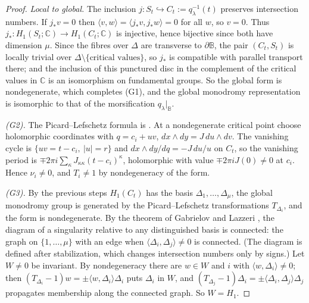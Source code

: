 \documentclass[11pt]{article}
\numberwithin{equation}{section}
\theoremstyle{definition}
\theoremstyle{remark}
\newcommand{\C}{\mathbb C}\newcommand{\Q}{\mathbb Q}\newcommand{\R}{\mathbb R}\newcommand{\Z}{\mathbb Z}
\begin{document}
\begin{proof}
\emph{Local to global.} The inclusion $j:S_t\hookrightarrow C_t:=q_\lambda^{-1}(t)$
preserves intersection numbers. If $j_*v=0$ then
$\langle v,w\rangle=\langle j_*v,j_*w\rangle=0$ for all $w$, so $v=0$. Thus
$j_*:H_1(S_t;\C)\to H_1(C_t;\C)$ is injective, hence bijective since both have
dimension $\mu$. Since the fibres over $\Delta$ are transverse to $\partial\mathbb B$, the pair
$(C_t,S_t)$ is locally trivial over $\Delta\setminus\{\text{critical values}\}$,
so $j_*$ is compatible with parallel transport there; and the inclusion of
this punctured disc in the complement of the critical values in $\C$ is an
isomorphism on fundamental groups. So the global form is
nondegenerate, which completes (G1), and the global monodromy representation is
isomorphic to that of the morsification $q_\lambda|_{\mathbb B}$.

\emph{(G2).} The Picard--Lefschetz formula is \cite[\S1.3, p.~26]{AGV}. At a
nondegenerate critical point choose holomorphic coordinates with
$q=c_i+uv$, $dx\wedge dy=J\,du\wedge dv$. The vanishing cycle is
$\{uv=t-c_i,\ |u|=r\}$ and $dx\wedge dy/dq=-J\,du/u$ on $C_t$, so the vanishing
period is $\mp2\pi i\sum_\kappa J_{\kappa\kappa}(t-c_i)^\kappa$, holomorphic with
value $\mp2\pi iJ(0)\ne0$ at $c_i$. Hence $\nu_i\ne0$, and $T_i\ne1$ by
nondegeneracy of the form.

\emph{(G3).} By the previous steps $H_1(C_t)$ has the basis
$\Delta_1,\dots,\Delta_\mu$, the global monodromy group is generated by the
Picard--Lefschetz transformations $T_{\Delta_i}$, and the form is nondegenerate.
By the theorem of Gabrielov and Lazzeri \cite[Theorem~3.3]{AGV}, the diagram of
a singularity relative to any distinguished basis is connected: the graph on
$\{1,\dots,\mu\}$ with an edge when $\langle\Delta_i,\Delta_j\rangle\ne0$ is
connected. (The diagram is defined after stabilization, which changes
intersection numbers only by signs.) Let $W\ne0$ be invariant. By
nondegeneracy there are $w\in W$ and $i$ with $\langle w,\Delta_i\rangle\ne0$;
then $(T_{\Delta_i}-1)w=\pm\langle w,\Delta_i\rangle\Delta_i$ puts $\Delta_i$ in
$W$, and $(T_{\Delta_j}-1)\Delta_i=\pm\langle\Delta_i,\Delta_j\rangle\Delta_j$
propagates membership along the connected graph. So $W=H_1$.
\end{proof}
\end{document}
